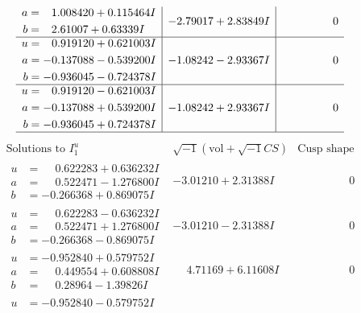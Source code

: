 \documentclass[1p]{elsarticle_modified}
\theoremstyle{definition}
\newcommand{\I}{\sqrt{-1}}
\begin{document}
$$\begin{array}{c|c|c}
\begin{aligned}
a &= \phantom{-}1.008420 + 0.115464 I \\
b &= \phantom{-}2.61007 + 0.63339 I\end{aligned}
 & -2.79017 + 2.83849 I & \phantom{-0.000000 } 0 \\ \hline\begin{aligned}
u &= \phantom{-}0.919120 + 0.621003 I \\
a &= -0.137088 - 0.539200 I \\
b &= -0.936045 - 0.724378 I\end{aligned}
 & -1.08242 - 2.93367 I & \phantom{-0.000000 } 0 \\ \hline\begin{aligned}
u &= \phantom{-}0.919120 - 0.621003 I \\
a &= -0.137088 + 0.539200 I \\
b &= -0.936045 + 0.724378 I\end{aligned}
 & -1.08242 + 2.93367 I & \phantom{-0.000000 } 0\\
 \hline 
 \end{array}$$\newpage$$\begin{array}{c|c|c}  
\text{Solutions to }I^u_{1}& \I (\text{vol} + \sqrt{-1}CS) & \text{Cusp shape}\\
 \hline 
\begin{aligned}
u &= \phantom{-}0.622283 + 0.636232 I \\
a &= \phantom{-}0.522471 - 1.276800 I \\
b &= -0.266368 + 0.869075 I\end{aligned}
 & -3.01210 + 2.31388 I & \phantom{-0.000000 } 0 \\ \hline\begin{aligned}
u &= \phantom{-}0.622283 - 0.636232 I \\
a &= \phantom{-}0.522471 + 1.276800 I \\
b &= -0.266368 - 0.869075 I\end{aligned}
 & -3.01210 - 2.31388 I & \phantom{-0.000000 } 0 \\ \hline\begin{aligned}
u &= -0.952840 + 0.579752 I \\
a &= \phantom{-}0.449554 + 0.608808 I \\
b &= \phantom{-}0.28964 - 1.39826 I\end{aligned}
 & \phantom{-}4.71169 + 6.11608 I & \phantom{-0.000000 } 0 \\ \hline\begin{aligned}
u &= -0.952840 - 0.579752 I \\

\end{aligned}
\end{array}$$
\end{document}
